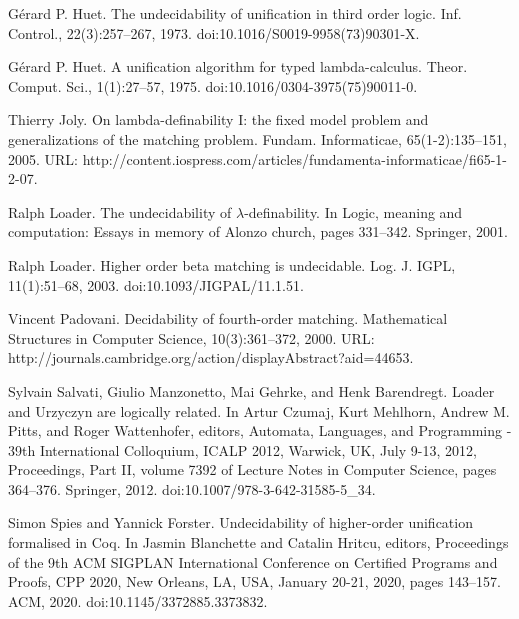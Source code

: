 \par\noindent  [9]  Gérard P. Huet.  The undecidability of unification in third order logic.  Inf. Control., 22(3):257–267, 1973.  doi:10.1016/S0019-9958(73)90301-X.  
 
\par\noindent  [10]  Gérard P. Huet.  A unification algorithm for typed lambda-calculus.  Theor. Comput. Sci., 1(1):27–57, 1975.  doi:10.1016/0304-3975(75)90011-0.  
 
\par\noindent  [11]  Thierry Joly.  On lambda-definability I: the fixed model problem and generalizations of the matching problem.  Fundam. Informaticae, 65(1-2):135–151, 2005.  URL: http://content.iospress.com/articles/fundamenta-informaticae/fi65-1-2-07.  
 
\par\noindent  [12]  Ralph Loader.  The undecidability of $\lambda$-definability.  In Logic, meaning and computation: Essays in memory of Alonzo church, pages 331–342. Springer, 2001.  
 
\par\noindent  [13]  Ralph Loader.  Higher order beta matching is undecidable.  Log. J. IGPL, 11(1):51–68, 2003.  doi:10.1093/JIGPAL/11.1.51.  
 
\par\noindent  [14]  Vincent Padovani.  Decidability of fourth-order matching.  Mathematical Structures in Computer Science, 10(3):361–372, 2000.  URL: http://journals.cambridge.org/action/displayAbstract?aid=44653.  
 
\par\noindent  [15]  Sylvain Salvati, Giulio Manzonetto, Mai Gehrke, and Henk Barendregt.  Loader and Urzyczyn are logically related.  In Artur Czumaj, Kurt Mehlhorn, Andrew M. Pitts, and Roger Wattenhofer, editors, Automata, Languages, and Programming - 39th International Colloquium, ICALP 2012, Warwick, UK, July 9-13, 2012, Proceedings, Part II, volume 7392 of Lecture Notes in Computer Science, pages 364–376. Springer, 2012.  doi:10.1007/978-3-642-31585-5\_34.  
 
\par\noindent  [16]  Simon Spies and Yannick Forster.  Undecidability of higher-order unification formalised in Coq.  In Jasmin Blanchette and Catalin Hritcu, editors, Proceedings of the 9th ACM SIGPLAN International Conference on Certified Programs and Proofs, CPP 2020, New Orleans, LA, USA, January 20-21, 2020, pages 143–157. ACM, 2020.  doi:10.1145/3372885.3373832.  
 
